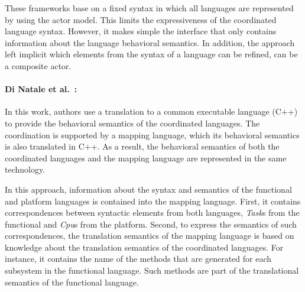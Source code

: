 These frameworks base on a fixed syntax in which all languages are represented by using the actor model. This limits the expressiveness of the coordinated language syntax. However, it makes simple the interface that only contains information about the language behavioral semantics. In addition, the approach left implicit which elements from the syntax of a language can be refined, \ie can be a composite actor.   

     

 	


\paragraph{Di Natale et al.~\cite{dinatale}:}
In this work, authors use a translation to a common executable language (\ie C++) to provide the behavioral semantics of the coordinated languages. The coordination is supported by a mapping language, which its behavioral semantics is also translated in C++. As a result, the behavioral semantics of both the coordinated languages and the mapping language are represented in the same technology.

In this approach, information about the syntax and semantics of the functional and platform languages is contained into the mapping language. First, it contains correspondences between syntactic elements from both languages, \eg \emph{Task}s from the functional and \emph{Cpu}s from the platform. Second, to express the semantics of such correspondences, the translation semantics of the mapping language is based on knowledge about the translation semantics of the coordinated languages. For instance, it contains the name of the methods that are generated for each subsystem in the functional language. Such methods are part of the translational semantics of the functional language. 

